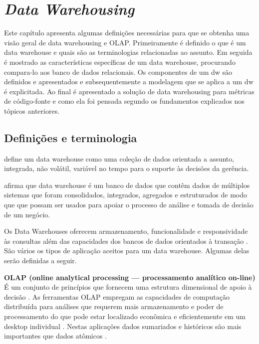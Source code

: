 \chapter{\textit{Data Warehousing}} 
\label{chap:dw}

	Este capítulo apresenta algumas definições necessárias para que se obtenha uma visão geral de data warehousing e OLAP. Primeiramente é definido o que é um data warehouse e quais são as terminologias relacionadas ao assunto. Em seguida é mostrado as características específicas de um data warehouse, procurando compara-lo aos banco de dados relacionais. Os componentes de um dw são definidos e apresentados e subsequentemente a modelagem que se aplica a um dw é explicitada. Ao final é apresentado a solução de data warehousing para métricas de código-fonte e como ela foi pensada segundo os fundamentos explicados nos tópicos anteriores.

\section{Definições e terminologia}\label{sec:intro}

 define um data warehouse como uma coleção de dados orientada a assunto, integrada, não volátil, variável no tempo para o suporte às decisões da gerência.

 afirma que data warehouse é um banco de dados que contêm dados de múltiplos sistemas que foram consolidados, integrados, agregados e estruturados de modo que que possam ser usados para apoiar o processo de análise e tomada de decisão de um negócio.
 
Os Data Warehouses oferecem armazenamento, funcionalidade e responsividade às consultas além das capacidades dos bancos de dados orientados à transação \cite{elmasri_sistemas_2011}. São vários os tipos de aplicação aceitos para um data warehouse. Algumas delas serão definidas a seguir.


\textbf{OLAP (online analytical processing — processamento analítico on-line)}
É um conjunto de princípios que fornecem uma estrutura dimensional de apoio à decisão \cite{Kimball2002}. As ferramentas OLAP empregam as capacidades de computação distribuída para análises que requerem mais armazenamento e poder de processamento do que pode estar localizado econômica e eficientemente em um desktop individual \cite{elmasri_sistemas_2011}. Nestas aplicações dados sumariados e históricos são mais importantes que dados atômicos \cite{hilmer2002}.

